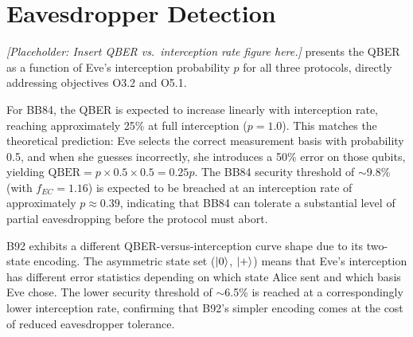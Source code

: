 \documentclass[10pt, a4paper]{report}
\begin{document}



\section{Eavesdropper Detection}


\textit{[Placeholder: Insert QBER vs.\ interception rate figure here.]}  presents the QBER as a function of Eve's interception probability $p$ for all three protocols, directly addressing objectives O3.2 and O5.1.

For BB84, the QBER is expected to increase linearly with interception rate, reaching approximately 25\% at full interception ($p = 1.0$). This matches the theoretical prediction: Eve selects the correct measurement basis with probability 0.5, and when she guesses incorrectly, she introduces a 50\% error on those qubits, yielding $\text{QBER} = p \times 0.5 \times 0.5 = 0.25p$. The BB84 security threshold of $\sim$9.8\% (with $f_{EC} = 1.16$) is expected to be breached at an interception rate of approximately $p \approx 0.39$, indicating that BB84 can tolerate a substantial level of partial eavesdropping before the protocol must abort.

B92 exhibits a different QBER-versus-interception curve shape due to its two-state encoding. The asymmetric state set ($\ket{0}$, $\ket{+}$) means that Eve's interception has different error statistics depending on which state Alice sent and which basis Eve chose. The lower security threshold of $\sim$6.5\% is reached at a correspondingly lower interception rate, confirming that B92's simpler encoding comes at the cost of reduced eavesdropper tolerance.
\end{document}
